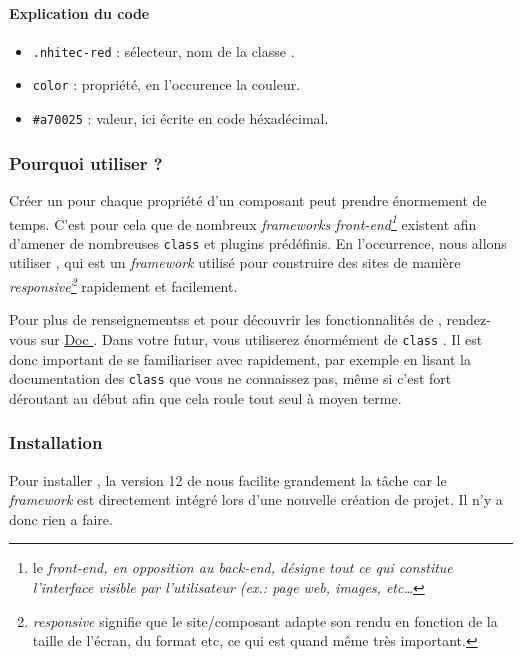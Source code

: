 \paragraph{Explication du code}
\begin{itemize}
    \item \verb|.nhitec-red| : sélecteur, nom de la classe \css{}.
    \item \verb|color| : propriété, en l'occurence la couleur.
    \item \verb|#a70025| : valeur, ici écrite en code héxadécimal.
\end{itemize}

\subsubsection[Pourquoi utiliser Tailwind?][fr.wikipedia.org/wiki/Tailwind\_CSS]{Pourquoi utiliser \tailwind{}?}
Créer un \css{} pour chaque propriété d'un composant peut prendre énormement de temps. C'est pour cela que de nombreux \textit{frameworks front-end\footnote{le \textit{front-end, en opposition au back-end, désigne tout ce qui constitue l'interface visible par l'utilisateur (ex.: page web, images, etc\ldots}}} existent afin d'amener de nombreuses \verb|class| et plugins \js{} prédéfinis. En l'occurrence, nous allons utiliser \tailwind{}, qui est un \textit{framework} utilisé pour construire des sites de manière \textit{responsive\footnote{\textit{responsive} signifie que le site/composant adapte son rendu en fonction de la taille de l'écran, du format etc, ce qui est quand même très important.}} rapidement et facilement.

Pour plus de renseignementss et pour découvrir les fonctionnalités de \tailwind{}, rendez-vous sur \href{https://tailwindcss.com/docs}{Doc \tailwind{}}. Dans votre futur, vous utiliserez énormément de \verb|class| \tailwind. Il est donc important de se familiariser avec rapidement, par exemple en lisant la documentation des \verb|class| que vous ne connaissez pas, même si c'est fort déroutant au début afin que cela roule tout seul à moyen terme.

\subsubsection[Installation]{Installation}

Pour installer \tailwind{}, la version 12 de \laravel{} nous facilite grandement la tâche car le \textit{framework} est directement intégré lors d'une nouvelle création de projet. Il n'y a donc rien a faire.

